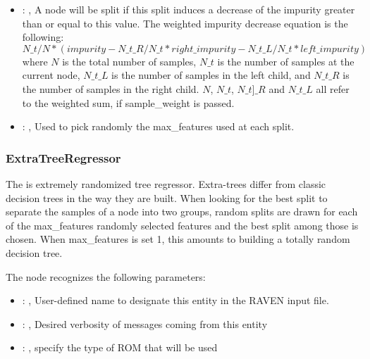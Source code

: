 \begin{itemize}
    \item {}: , 
      A node will be split if this split induces a decrease of the impurity greater than or equal to
      this value.                                                  The weighted impurity decrease
      equation is the following:                                                  $N\_t / N *
      (impurity - N\_t\_R / N\_t * right\_impurity - N\_t\_L / N\_t * left\_impurity)$
      where $N$ is the total number of samples, $N\_t$ is the number of samples at the current node,
      $N\_t\_L$ is the number                                                  of samples in the
      left child, and $N\_t\_R$ is the number of samples in the right child.
      $N$, $N\_t$, $N\_t]\_R$ and $N\_t\_L$ all refer to the weighted sum, if sample\_weight is
      passed.

    \item {}: , 
      Used to pick randomly the max\_features used at each split.
  \end{itemize}


\subsubsection{ExtraTreeRegressor}
  The  is extremely randomized tree regressor.
  Extra-trees differ from classic decision trees in the way they are built. When
  looking for the best split to separate the samples of a node into two groups,
  random splits are drawn for each of the max\_features randomly selected features
  and the best split among those is chosen. When max\_features is set 1, this amounts
  to building a totally random decision tree.

  The  node recognizes the following parameters:
    \begin{itemize}
      \item {}: , 
        User-defined name to designate this entity in the RAVEN input file.
      \item {}: , 
        Desired verbosity of messages coming from this entity
      \item {}: , 
        specify the type of ROM that will be used
  \end{itemize}

